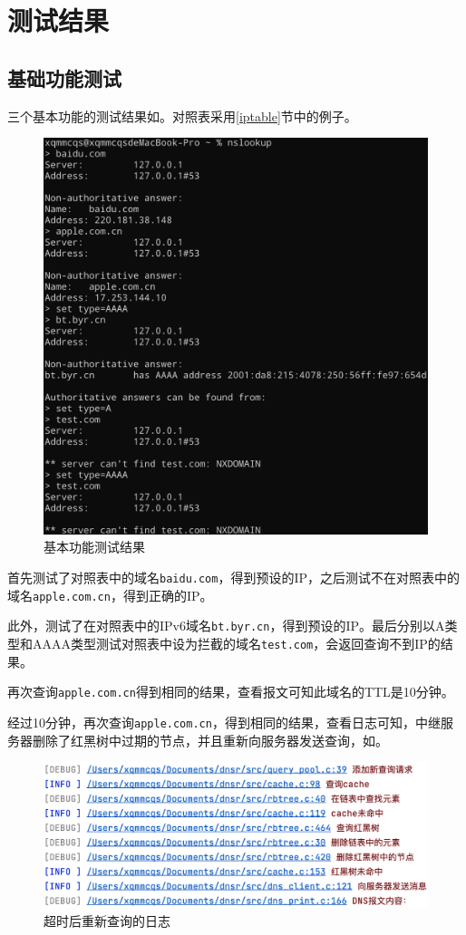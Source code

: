 \documentclass[lang=cn,11pt,a4paper,cite=authornum]{paper}
\begin{document}
\section{测试结果}

\subsection{基础功能测试}

三个基本功能的测试结果如。对照表采用\ref{iptable}节中的例子。

\begin{figure}[htbp]

    \centering
    \includegraphics[width=0.7\linewidth]{./Images/test.png}
    \caption{基本功能测试结果\label{fig:test}}

\end{figure}

首先测试了对照表中的域名\texttt{baidu.com}，得到预设的IP，之后测试不在对照表中的域名\texttt{apple.com.cn}，得到正确的IP。

此外，测试了在对照表中的IPv6域名\texttt{bt.byr.cn}，得到预设的IP。最后分别以A类型和AAAA类型测试对照表中设为拦截的域名\texttt{test.com}，会返回查询不到IP的结果。

再次查询\texttt{apple.com.cn}得到相同的结果，查看报文可知此域名的TTL是10分钟。

经过10分钟，再次查询\texttt{apple.com.cn}，得到相同的结果，查看日志可知，中继服务器删除了红黑树中过期的节点，并且重新向服务器发送查询，如。

\begin{figure}[htbp]

    \centering
    \includegraphics[width=0.7\linewidth]{./Images/resend.png}
    \caption{超时后重新查询的日志\label{fig:resend}}

\end{figure}
\end{document}
